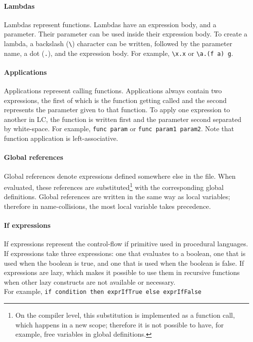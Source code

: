 \documentclass[12pt]{article}
\begin{document}
\paragraph{Lambdas} Lambdas represent functions. Lambdas have an expression
body, and a parameter. Their parameter can be used inside their expression
body. To create a lambda, a backslash (\verb$\$) character can be written,
followed by the parameter name, a dot (\verb$.$), and the expression body. For
example, \verb$\x.x$ or \verb$\a.(f a) g$.

\paragraph{Applications} Applications represent calling functions. Applications
always contain two expressions, the first of which is the function getting
called and the second represents the parameter given to that function. To apply
one expression to another in LC, the function is written first and the parameter
second separated by white-space. For example, \verb$func param$ or 
\verb$func param1 param2$.
\noindent
Note that function application is left-associative.

\paragraph{Global references} Global references denote expressions defined
somewhere else in the file. When evaluated, these references are
substituted\footnote{On the compiler level, this substitution is implemented as
    a function call, which happens in a new scope; therefore it is not possible
to have, for example, free variables in global definitions.} with the
corresponding global definitions. Global references are written in the same way
as local variables; therefore in name-collisions, the most local variable takes
precedence.

\paragraph{If expressions} If expressions represent the control-flow if
primitive used in procedural languages. If expressions take three expressions:
one that evaluates to a boolean, one that is used when the boolean is true, and
one that is used when the boolean is false. If expressions are lazy, which makes
it possible to use them in recursive functions when other lazy constructs are
not available or necessary. \\
For example, \verb$if condition then exprIfTrue else exprIfFalse$
\end{document}

